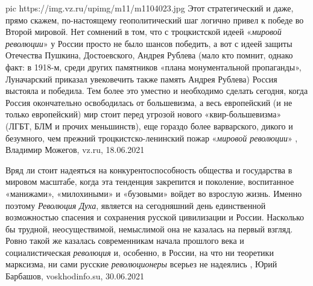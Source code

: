 \ifcmt
  pic https://img.vz.ru/upimg/m11/m1104023.jpg
\fi
Этот стратегический и даже, прямо скажем, по-настоящему геополитический шаг
логично привел к победе во Второй мировой. Нет сомнений в том, что с
троцкистской идеей «\emph{мировой революции}» у России просто не было шансов победить,
а вот с идеей защиты Отечества Пушкина, Достоевского, Андрея Рублева (мало кто
помнит, однако факт: в 1918-м, среди других памятников «плана монументальной
пропаганды», Луначарский приказал увековечить также память Андрея Рублева)
Россия выстояла и победила.  Тем более это уместно и необходимо сделать
сегодня, когда Россия окончательно освободилась от большевизма, а весь
европейский (и не только европейский) мир стоит перед угрозой нового
«квир-большевизма» (ЛГБТ, БЛМ и прочих меньшинств), еще гораздо более
варварского, дикого и безумного, чем прежний троцкистско-ленинский пожар
«\emph{мировой революции}»
, 
Владимир Можегов, vz.ru, 18.06.2021

Вряд ли стоит надеяться на конкурентоспособность общества и государства в
мировом масштабе, когда эта тенденция закрепится и поколение, воспитанное
«манижами», «милохиными» и «бузовыми» войдет во взрослую жизнь.  Именно поэтому
\emph{Революция Духа}, является на сегодняшний день единственной возможностью
спасения и сохранения русской цивилизации и России. Насколько бы трудной,
неосуществимой, немыслимой она не казалась на первый взгляд. Ровно такой же
казалась современникам начала прошлого века и социалистическая \emph{революция}
и, особенно, в России, на что ни теоретики марксизма, ни сами русские
\emph{революционеры} всерьез не надеялись
, 
Юрий Барбашов, voskhodinfo.su, 30.06.2021

